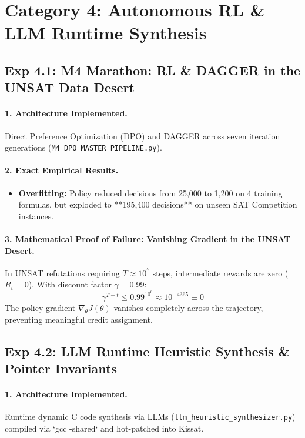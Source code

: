 \documentclass[11pt]{article}
\theoremstyle{definition}
\begin{document}
\newpage
\section{Category 4: Autonomous RL \& LLM Runtime Synthesis}

\subsection{Exp 4.1: M4 Marathon: RL \& DAGGER in the UNSAT Data Desert}
\paragraph{1. Architecture Implemented.}
Direct Preference Optimization (DPO) and DAGGER across seven iteration generations (\texttt{M4_DPO_MASTER_PIPELINE.py}).

\paragraph{2. Exact Empirical Results.}
\begin{itemize}
    \item \textbf{Overfitting:} Policy reduced decisions from 25,000 to 1,200 on 4 training formulas, but exploded to **195,400 decisions** on unseen SAT Competition instances.
\end{itemize}

\paragraph{3. Mathematical Proof of Failure: Vanishing Gradient in the UNSAT Desert.}
In UNSAT refutations requiring $T \approx 10^7$ steps, intermediate rewards are zero ($R_t = 0$). With discount factor $\gamma = 0.99$:
\begin{equation}
\gamma^{T-t} \le 0.99^{10^6} \approx 10^{-4365} \equiv 0
\end{equation}
The policy gradient $\nabla_\theta J(\theta)$ vanishes completely across the trajectory, preventing meaningful credit assignment.

\subsection{Exp 4.2: LLM Runtime Heuristic Synthesis \& Pointer Invariants}
\paragraph{1. Architecture Implemented.}
Runtime dynamic C code synthesis via LLMs (\texttt{llm_heuristic_synthesizer.py}) compiled via `gcc -shared` and hot-patched into Kissat.
\end{document}
